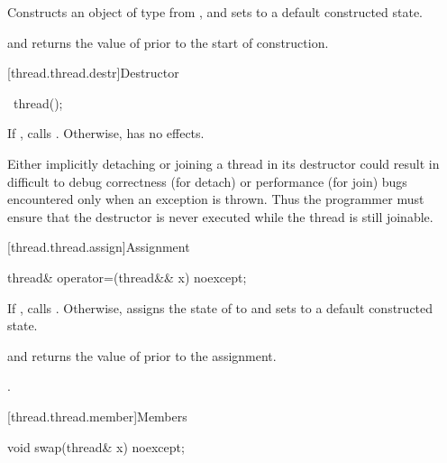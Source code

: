 \begin{itemdescr}
\pnum
\effects Constructs an object of type  from , and sets
 to a default constructed state.

\pnum
\ensures {} and  returns the
value of  prior to the start of construction.

\end{itemdescr}

[thread.thread.destr]{Destructor}

%
\begin{itemdecl}
~thread();
\end{itemdecl}

\begin{itemdescr}
\pnum
If , calls . Otherwise, has no effects.
\begin{note} Either implicitly detaching or joining a  thread in its
destructor could result in difficult to debug correctness (for detach) or performance
(for join) bugs encountered only when an exception is thrown. Thus the programmer must
ensure that the destructor is never executed while the thread is still joinable.
\end{note}
\end{itemdescr}

[thread.thread.assign]{Assignment}

%
\begin{itemdecl}
thread& operator=(thread&& x) noexcept;
\end{itemdecl}

\begin{itemdescr}
\pnum
\effects If , calls . Otherwise, assigns the
state of  to  and sets  to a default constructed state.

\pnum
\ensures {} and  returns the value of
 prior to the assignment.

\pnum
\returns {}.
\end{itemdescr}

[thread.thread.member]{Members}

%
\begin{itemdecl}
void swap(thread& x) noexcept;
\end{itemdecl}


